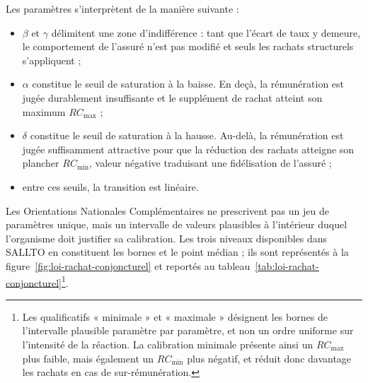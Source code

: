 Les paramètres s'interprètent de la manière suivante :
\begin{itemize}
  \item $\beta$ et $\gamma$ délimitent une zone d'indifférence : tant que l'écart de taux
        y demeure, le comportement de l'assuré n'est pas modifié et seuls les rachats
        structurels s'appliquent ;
  \item $\alpha$ constitue le seuil de saturation à la baisse. En deçà, la rémunération est
        jugée durablement insuffisante et le supplément de rachat atteint son maximum
        $RC_{\max}$ ;
  \item $\delta$ constitue le seuil de saturation à la hausse. Au-delà, la rémunération est
        jugée suffisamment attractive pour que la réduction des rachats atteigne son plancher
        $RC_{\min}$, valeur négative traduisant une fidélisation de l'assuré ;
  \item entre ces seuils, la transition est linéaire.
\end{itemize}

Les Orientations Nationales Complémentaires ne prescrivent pas un jeu de paramètres unique,
mais un intervalle de valeurs plausibles à l'intérieur duquel l'organisme doit justifier sa
calibration. Les trois niveaux disponibles dans SALLTO en constituent les bornes et le point
médian ; ils sont représentés à la figure~\ref{fig:loi-rachat-conjoncturel} et reportés au
tableau~\ref{tab:loi-rachat-conjoncturel}\footnote{Les qualificatifs « minimale » et
« maximale » désignent les bornes de l'intervalle plausible paramètre par paramètre, et non
un ordre uniforme sur l'intensité de la réaction. La calibration minimale présente ainsi un
$RC_{\max}$ plus faible, mais également un $RC_{\min}$ plus négatif, et réduit donc davantage
les rachats en cas de sur-rémunération.}.

